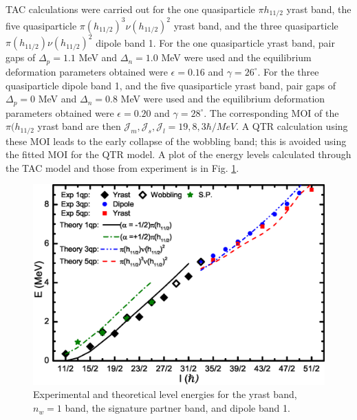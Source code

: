 TAC calculations were carried out for the one quasiparticle $\pi{}h_{11/2}$ yrast band, the five quasiparticle $\pi(h_{11/2})^3\nu(h_{11/2})^2$ yrast band, and the three quasiparticle $\pi(h_{11/2})\nu(h_{11/2})^2$ dipole band 1. For the one quasiparticle yrast band, pair gaps of $\Delta_p=1.1$ MeV and $\Delta_n=1.0$ MeV were used and the equilibrium deformation parameters obtained were $\epsilon=0.16$ and $\gamma=26^{\circ}$. For the three quasiparticle dipole band 1, and the five quasiparticle yrast band, pair gaps of $\Delta_p=0$ MeV and $\Delta_n=0.8$ MeV were used and the equilibrium deformation parameters obtained were $\epsilon=0.20$ and $\gamma=28^{\circ}$. The corresponding MOI of the $\pi(h_{11/2}$ yrast band are then $\mathcal{J}_m,\mathcal{J}_s,\mathcal{J}_l = 19, 8, 3 \hbar{}/MeV$. A QTR calculation using these MOI leads to the early collapse of the wobbling band; this is avoided using the fitted MOI for the QTR model. A plot of the energy levels calculated through the TAC model and those from experiment is in Fig. \ref{fig:chp4-TAC-en}.

\begin{figure}[t!]
\centerline{\includegraphics[width=\textwidth]{./img/c4/evj_new_yrast.eps}}
	\caption{Experimental and theoretical level energies for the yrast band, $n_w=1$ band, the signature partner band, and dipole band 1. \label{fig:chp4-TAC-en}}
\end{figure}

